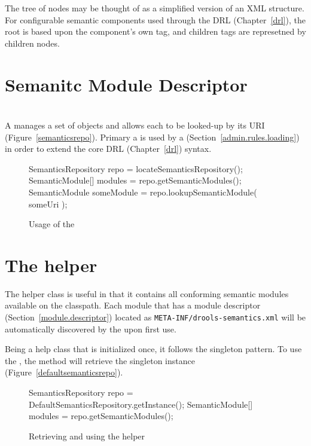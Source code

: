 The tree of  nodes may be thought of as
a simplified version of an XML structure.  For configurable semantic
components used through the DRL (Chapter~\vref{drl}), the root 
 is based upon the component's own tag, and
children tags are represetned by children 
nodes.

\section{Semanitc Module Descriptor}
\label{module.descriptor}


\section{}

A  manages a set of
 objects and allows each to be looked-up
by its URI (Figure~\vref{semanticsrepo}).  Primary a  is used by
a  (Section~\vref{admin.rules.loading})
in order to extend the core DRL (Chapter~\vref{drl}) syntax.

\begin{figure}
\begin{javaCodelisting}
SemanticsRepository repo       = locateSemanticsRepository();
SemanticModule[]    modules    = repo.getSemanticModules();
SemanticModule      someModule = repo.lookupSemanticModule( someUri );
\end{javaCodelisting}
\caption{Usage of the }
\label{semanticsrepo}
\end{figure}

\section{The  helper}

The  helper class is useful
in that it contains all conforming semantic modules available on
the classpath.  Each module that has a module descriptor
(Section~\vref{module.descriptor}) located as
\texttt{META-INF/drools-semantics.xml}
will be automatically discovered by the
upon first use.  

Being a help class that is initialized once, it follows the
singleton pattern.  To use the
, the
method will retrieve the singleton instance
(Figure~\vref{defaultsemanticsrepo}).

\begin{figure}
\begin{javaCodelisting}
SemanticsRepository repo    = DefaultSemanticsRepository.getInstance();
SemanticModule[]    modules = repo.getSemanticModules();
\end{javaCodelisting}
\caption{Retrieving and using the
 helper}
\label{defaultsemanticsrepo}
\end{figure}

